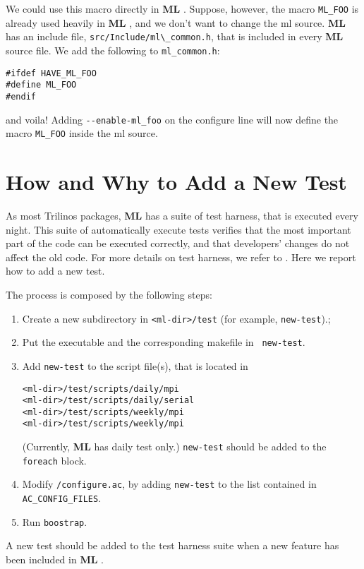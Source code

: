 \documentclass[10pt,letter,relax]{SANDreport}
\newcommand{\ML}     {{\bf ML }}
\begin{document}
We could use this macro directly in \ML.
Suppose, however, the macro \verb!ML_FOO! is already used
heavily in \ML, and we don't want to change the ml source.
\ML has an include file, \verb!src/Include/ml\_common.h!, that is included in
every \ML source file.
We add the following to \verb!ml_common.h!:
\begin{verbatim}
#ifdef HAVE_ML_FOO
#define ML_FOO
#endif
\end{verbatim}
and voila!   Adding \verb!--enable-ml_foo! on the configure line will now define the
macro \verb!ML_FOO! inside the ml source.


\section{How and Why to Add a New Test}
\label{sec:add_test}

As most Trilinos packages, \ML has a suite of test harness, that is
executed every night. This suite of automatically execute tests verifies
that the most important part of the code can be executed correctly, and
that developers' changes do not affect the old code.  For more details
on test harness, we refer to \cite[Section 3.3]{Trilinos-Dev-Guide}.
Here we report how to add a new test.

The process is composed by the following steps:
\begin{enumerate}
\item Create a new subdirectory in \verb!<ml-dir>/test! (for example,
  {\tt new-test}).;
\item Put the executable and the corresponding makefile in {\tt
    new-test}.
\item Add {\tt new-test} to the script file(s), that is located in 
\begin{verbatim}
<ml-dir>/test/scripts/daily/mpi
<ml-dir>/test/scripts/daily/serial
<ml-dir>/test/scripts/weekly/mpi
<ml-dir>/test/scripts/weekly/mpi
\end{verbatim}
(Currently, \ML has daily test only.) {\tt new-test} should be added to
the {\tt foreach} block.
\item Modify {\tt <ml-dir>/configure.ac}, by adding {\tt new-test} to
  the list contained in {\tt AC\_CONFIG\_FILES}.
\item Run {\tt boostrap}.
\end{enumerate}

A new test should be added to the test harness suite when a new feature
has been included in \ML. 
\end{document}
